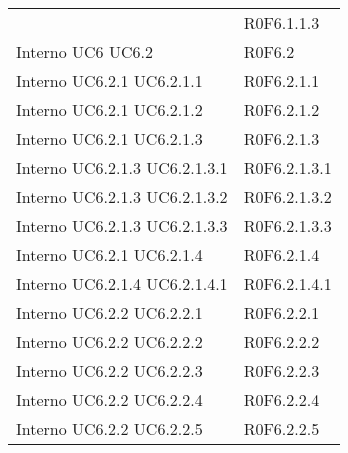 \begin{longtable}{p{2.5cm}!{\VRule[1pt]}p{2.5cm}}
 & R0F6.1.1.3 \\
Interno \newline UC6
 \newline UC6.2
 & R0F6.2 \\
Interno \newline UC6.2.1
 \newline UC6.2.1.1
 & R0F6.2.1.1 \\
Interno \newline UC6.2.1
 \newline UC6.2.1.2
 & R0F6.2.1.2 \\
Interno \newline UC6.2.1
 \newline UC6.2.1.3
 & R0F6.2.1.3 \\
Interno \newline UC6.2.1.3
 \newline UC6.2.1.3.1
 & R0F6.2.1.3.1 \\
Interno \newline UC6.2.1.3
 \newline UC6.2.1.3.2
 & R0F6.2.1.3.2 \\
Interno \newline UC6.2.1.3
 \newline UC6.2.1.3.3
 & R0F6.2.1.3.3 \\
Interno \newline UC6.2.1
 \newline UC6.2.1.4
 & R0F6.2.1.4 \\
Interno \newline UC6.2.1.4
 \newline UC6.2.1.4.1
 & R0F6.2.1.4.1 \\
Interno \newline UC6.2.2
 \newline UC6.2.2.1
 & R0F6.2.2.1 \\
Interno \newline UC6.2.2
 \newline UC6.2.2.2
 & R0F6.2.2.2 \\
Interno \newline UC6.2.2
 \newline UC6.2.2.3
 & R0F6.2.2.3 \\
Interno \newline UC6.2.2
 \newline UC6.2.2.4
 & R0F6.2.2.4 \\
Interno \newline UC6.2.2
 \newline UC6.2.2.5
 & R0F6.2.2.5 \\

\end{longtable}
